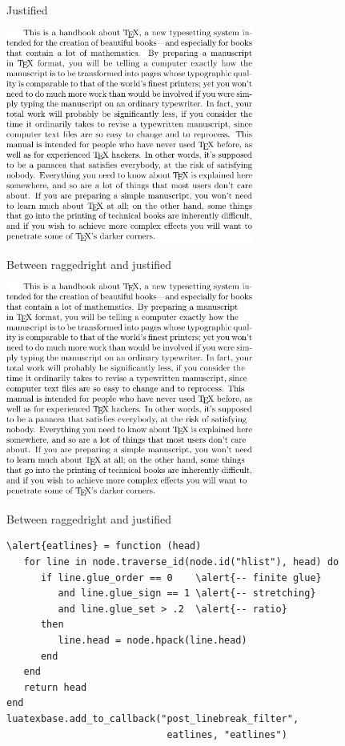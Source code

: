 \documentclass[t,10pt]{beamer}
\begin{document}
\begin{frame}[fragile]{Justified}
  \begin{center}
    \includegraphics[width=3.2in]{victor_org.pdf}
  \end{center}
\end{frame}

\begin{frame}[fragile]{Between raggedright and justified}
  \begin{center}
    \includegraphics[width=3.2in]{victor.pdf}
  \end{center}
\end{frame}

\begin{frame}[fragile]{Between raggedright and justified}
  \begin{Verbatim}[fontsize=\small,commandchars=\\\{\}]
\alert{eatlines} = function (head)
   for line in node.traverse_id(node.id("hlist"), head) do
      if line.glue_order == 0    \alert{-- finite glue}
         and line.glue_sign == 1 \alert{-- stretching}
         and line.glue_set > .2  \alert{-- ratio}
      then
         line.head = node.hpack(line.head)
      end
   end
   return head
end
luatexbase.add_to_callback("post_linebreak_filter",
                            eatlines, "eatlines")
  \end{Verbatim}
\end{frame}
\end{document}
